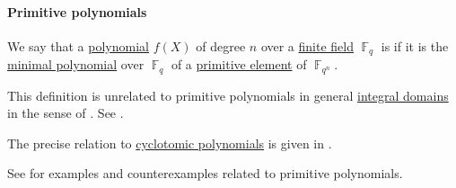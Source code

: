 \paragraph{Primitive polynomials}

\begin{definition}\label{def:finite_field_primitive_polynomial}
  We say that a \hyperref[def:polynomial_algebra/polynomials]{polynomial} \( f(X) \) of degree \( n \) over a \hyperref[def:finite_field]{finite field} \( \BbbF_q \) is  if it is the \hyperref[def:algebraic_element_minimal_polynomial]{minimal polynomial} over \( \BbbF_q \) of a \hyperref[def:finite_field_primitive_element]{primitive element} of \( \BbbF_{q^n} \).
\end{definition}
\begin{comments}
  \item This definition is unrelated to primitive polynomials in general \hyperref[def:integral_domain]{integral domains} in the sense of . See .

  \item The precise relation to \hyperref[def:cyclotomic_polynomial]{cyclotomic polynomials} is given in .

  \item See  for examples and counterexamples related to primitive polynomials.
\end{comments}

